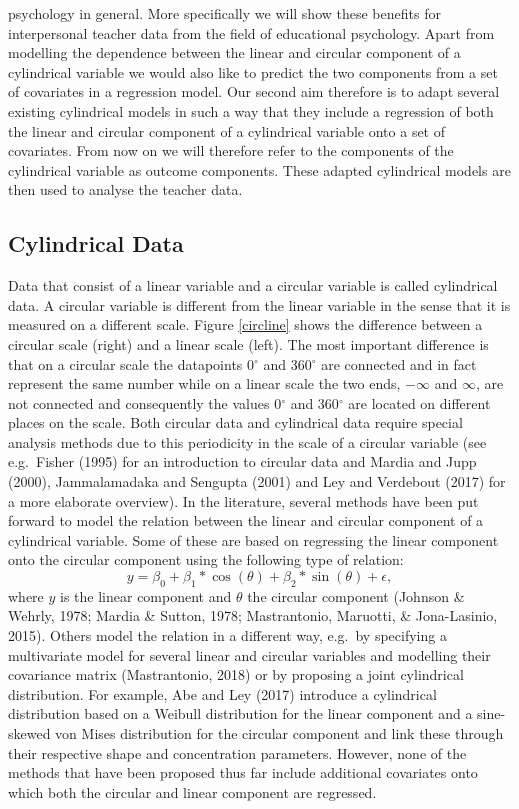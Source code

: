 \documentclass[man,mask]{apa6}
\begin{document}
psychology in general. More specifically we will show these benefits for
interpersonal teacher data from the field of educational psychology. Apart from
modelling the dependence between the linear and circular component of a
cylindrical variable we would also like to predict the two components from a set
of covariates in a regression model. Our second aim therefore is to adapt
several existing cylindrical models in such a way that they include a regression
of both the linear and circular component of a cylindrical variable onto a set
of covariates. From now on we will therefore refer to the components of the
cylindrical variable as outcome components. These adapted cylindrical models are
then used to analyse the teacher data.

\vspace{-0.75cm}
\subsection{Cylindrical Data}
\vspace{-0.75cm}

Data that consist of a linear variable and a circular variable is called
cylindrical data. A circular variable is different from the linear variable in
the sense that it is measured on a different scale. Figure \ref{circline} shows
the difference between a circular scale (right) and a linear scale (left). The
most important difference is that on a circular scale the datapoints 0\(^\circ\)
and 360\(^\circ\) are connected and in fact represent the same number while on a
linear scale the two ends, \(-\infty\) and \(\infty\), are not connected and
consequently the values 0\(^\circ\) and 360\(^\circ\) are located on different
places on the scale. Both circular data and cylindrical data require special
analysis methods due to this periodicity in the scale of a circular variable
(see e.g.~Fisher (1995) for an introduction to circular data and
Mardia and Jupp (2000), Jammalamadaka and Sengupta (2001) and Ley and Verdebout (2017) for a more
elaborate overview).\newline
\indent In the literature, several methods have been put forward to model the
relation between the linear and circular component of a cylindrical variable.
Some of these are based on regressing the linear component onto the circular
component using the following type of relation: \[y = \beta_0 +
\beta_1*\cos(\theta) + \beta_2*\sin(\theta)+ \epsilon,\] where \(y\) is the
linear component and \(\theta\) the circular component (Johnson \& Wehrly, 1978; Mardia \& Sutton, 1978; Mastrantonio, Maruotti, \& Jona-Lasinio, 2015). Others model the relation in a
different way, e.g.~by specifying a multivariate model for several linear and
circular variables and modelling their covariance matrix
(Mastrantonio, 2018) or by proposing a joint cylindrical distribution. For
example, Abe and Ley (2017) introduce a cylindrical distribution based on a
Weibull distribution for the linear component and a sine-skewed von Mises
distribution for the circular component and link these through their respective
shape and concentration parameters. However, none of the methods that have been
proposed thus far include additional covariates onto which both the circular and
linear component are regressed.
\end{document}
